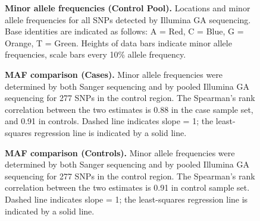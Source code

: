 \begin{figure}
\noindent{}
  \caption[Minor Allele Frequencies for Control Pool]{
    \small{\textbf{Minor allele frequencies (Control Pool).} Locations and minor allele frequencies for all SNPs detected by Illumina GA sequencing.  Base identities are indicated as follows: A = Red, C = Blue, G = Orange, T = Green.  Heights of data bars indicate minor allele frequencies, scale bars every 10\% allele frequency.}}
  \label{var.fig.snp_cont}
\end{figure}

\begin{figure}
\noindent{}
  \caption[MAF Comparison for Cases]{
    \small{\textbf{MAF comparison (Cases).}  Minor allele frequencies were determined by both Sanger sequencing and by pooled Illumina GA sequencing for 277 SNPs in the control region.  The Spearman's rank correlation between the two estimates is 0.88 in the case sample set, and 0.91 in controls.  Dashed line indicates slope = 1; the least-squares regression line is indicated by a solid line.}}
  \label{var.fig.comparison_case}
\end{figure}

\begin{figure}
\noindent{}
  \caption[MAF Comparison for Controls]{
    \small{\textbf{MAF comparison (Controls).}  Minor allele frequencies were determined by both Sanger sequencing and by pooled Illumina GA sequencing for 277 SNPs in the control region.  The Spearman's rank correlation between the two estimates is 0.91 in control sample set.  Dashed line indicates slope = 1; the least-squares regression line is indicated by a solid line.}}
  \label{var.fig.comparison_cont}
\end{figure}

